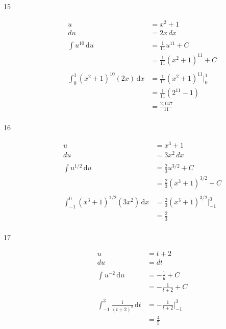 \documentclass{exam}
\begin{document}
\begin{description}

\item[15]

\begin{align*}
  u &= x^2 + 1 \\
  du &= 2x \, dx \\
\\
  \int u^{10} \, \mathrm{d}u &= \frac{1}{11} u^{11} + C \\
  &= \frac{1}{11} (x^2 + 1)^{11} + C \\
\\
  \int_0^1 (x^2 + 1)^{10} (2x) \, \mathrm{d}x &= \frac{1}{11} (x^2 + 1)^{11} \bigg|_0^1 \\
  &= \frac{1}{11} (2^{11} - 1) \\
  &= \frac{2,047}{11} \\
\end{align*}

\item[16]

\begin{align*}
  u &= x^3 + 1 \\
  du &= 3x^2 \, dx \\
\\
  \int u^{1/2} \, \mathrm{d}u &= \frac{2}{3} u^{3/2} + C \\
  &= \frac{2}{3} (x^3 + 1)^{3/2} + C \\
\\
  \int_{-1}^0 (x^3 + 1)^{1/2} (3x^2)  \, \mathrm{d}x &= \frac{2}{3} (x^3 + 1)^{3/2} \bigg|_{-1}^0 \\
  &= \frac{2}{3} \\
\end{align*}

\item[17]

\begin{align*}
  u &= t + 2 \\
  du &= dt \\
\\
  \int u^{-2} \, \mathrm{d}u &= - \frac{1}{u} + C \\
  &= - \frac{1}{t + 2} + C \\
\\
  \int_{-1}^3 \frac{1}{(t + 2)^2} \, \mathrm{d}t &= - \frac{1}{t + 2} \bigg|_{-1}^3 \\
  &= \frac{4}{5} \\
\end{align*}


\end{description}
\end{document}
